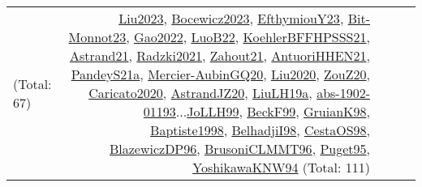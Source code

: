 {\begin{longtable}{p{3cm}r>{\raggedright\arraybackslash}p{6cm}>{\raggedright\arraybackslash}p{6cm}>{\raggedright\arraybackslash}p{8cm}}
(Total: 67) & \hyperref[detail:Liu2023]{Liu2023}, \hyperref[detail:Bocewicz2023]{Bocewicz2023}, \hyperref[detail:EfthymiouY23]{EfthymiouY23}, \hyperref[detail:Bit-Monnot23]{Bit-Monnot23}, \hyperref[detail:Gao2022]{Gao2022}, \hyperref[detail:LuoB22]{LuoB22}, \hyperref[detail:KoehlerBFFHPSSS21]{KoehlerBFFHPSSS21}, \hyperref[detail:Astrand21]{Astrand21}, \hyperref[detail:Radzki2021]{Radzki2021}, \hyperref[detail:Zahout21]{Zahout21}, \hyperref[detail:AntuoriHHEN21]{AntuoriHHEN21}, \hyperref[detail:PandeyS21a]{PandeyS21a}, \hyperref[detail:Mercier-AubinGQ20]{Mercier-AubinGQ20}, \hyperref[detail:Liu2020]{Liu2020}, \hyperref[detail:ZouZ20]{ZouZ20}, \hyperref[detail:Caricato2020]{Caricato2020}, \hyperref[detail:AstrandJZ20]{AstrandJZ20}, \hyperref[detail:LiuLH19a]{LiuLH19a}, \hyperref[detail:abs-1902-01193]{abs-1902-01193}...\hyperref[detail:JoLLH99]{JoLLH99}, \hyperref[detail:BeckF99]{BeckF99}, \hyperref[detail:GruianK98]{GruianK98}, \hyperref[detail:Baptiste1998]{Baptiste1998}, \hyperref[detail:BelhadjiI98]{BelhadjiI98}, \hyperref[detail:CestaOS98]{CestaOS98}, \hyperref[detail:BlazewiczDP96]{BlazewiczDP96}, \hyperref[detail:BrusoniCLMMT96]{BrusoniCLMMT96}, \hyperref[detail:Puget95]{Puget95}, \hyperref[detail:YoshikawaKNW94]{YoshikawaKNW94} (Total: 111)\\

\end{longtable}}

